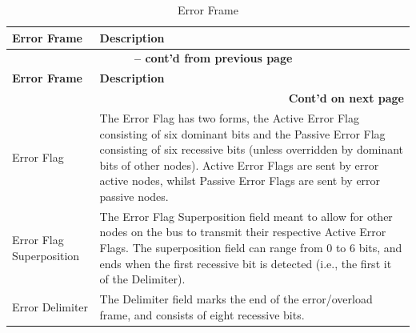 \begin{longtable}[c]{|p{4cm}|p{11cm}|} 
    
  \caption{Error Frame}
  \label{tab:twai-error-frame} 
  \\\hline
  \rowcolor{lightgray}
  \textbf{Error Frame} & \textbf{Description}
  \\\hline
  \endfirsthead
  
  \multicolumn{2}{c}{\bfseries \tablename\ \thetable{} -- cont'd from previous page}\\  \hline
  
  \rowcolor{lightgray}
    \textbf{Error Frame} & \textbf{Description}
  \\\hline
  \endhead
  
  \multicolumn{2}{r}{\textbf{Cont'd on next page}} \\
  \endfoot
  \endlastfoot

    Error Flag & The Error Flag has two forms, the Active Error Flag consisting of six dominant bits and the Passive Error Flag consisting of six recessive bits (unless overridden by dominant bits of other nodes). Active Error Flags are sent by error active nodes, whilst Passive Error Flags are sent by error passive nodes.
          \\\hline
    Error Flag Superposition & The Error Flag Superposition field meant to allow for other nodes on the bus to transmit their respective Active Error Flags. The superposition field can range from 0 to 6 bits, and ends when the first recessive bit is detected (i.e., the first it of the Delimiter).           \\\hline
    Error Delimiter & The Delimiter field marks the end of the error/overload frame, and consists of eight recessive bits.                                                  
          \\\hline
\end{longtable}
